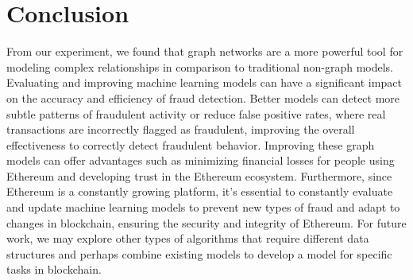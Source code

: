 \documentclass{article}
\begin{document}
\section{Conclusion}
    From our experiment, we found that graph networks are a more powerful tool for modeling complex relationships in comparison to traditional non-graph models. Evaluating and improving machine learning models can have a significant impact on the accuracy and efficiency of fraud detection. Better models can detect more subtle patterns of fraudulent activity or reduce false positive rates, where real transactions are incorrectly flagged as fraudulent, improving the overall effectiveness to correctly detect fraudulent behavior. Improving these graph models can offer advantages such as minimizing financial losses for people using Ethereum and developing trust in the Ethereum ecosystem. Furthermore, since Ethereum is a constantly growing platform, it’s essential to constantly evaluate and update machine learning models to prevent new types of fraud and adapt to changes in blockchain, ensuring the security and integrity of Ethereum. For future work, we may explore other types of algorithms that require different data structures and perhaps combine existing models to develop a model for specific tasks in blockchain. 
\end{document}
